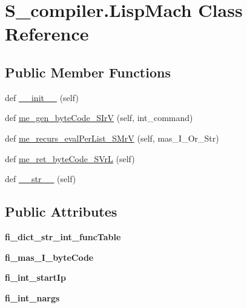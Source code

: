 \hypertarget{class_s__compiler_1_1_lisp_mach}{}\section{S\+\_\+compiler.\+Lisp\+Mach Class Reference}
\label{class_s__compiler_1_1_lisp_mach}
\subsection*{Public Member Functions}
\begin{DoxyCompactItemize}
\item 
def \hyperlink{class_s__compiler_1_1_lisp_mach_ae8fc48aace9204d62bd03ab919f28006}{\+\_\+\+\_\+init\+\_\+\+\_\+} (self)
\item 
def \hyperlink{class_s__compiler_1_1_lisp_mach_a5c4b8e5f7cfd068c6d221a83c74019bf}{me\+\_\+gen\+\_\+byte\+Code\+\_\+\+S\+IrV} (self, int\+\_\+command)
\item 
def \hyperlink{class_s__compiler_1_1_lisp_mach_aa1cda09961d2dfad40a4afe460a280fb}{me\+\_\+recurs\+\_\+eval\+Per\+List\+\_\+\+S\+MrV} (self, mas\+\_\+\+I\+\_\+\+Or\+\_\+\+Str)
\item 
def \hyperlink{class_s__compiler_1_1_lisp_mach_a97d7a7d63ea6cdaa32159a7f10947dfb}{me\+\_\+ret\+\_\+byte\+Code\+\_\+\+S\+VrL} (self)
\item 
def \hyperlink{class_s__compiler_1_1_lisp_mach_ae9e76191e088fb5607dcc5f0b30bf831}{\+\_\+\+\_\+str\+\_\+\+\_\+} (self)
\end{DoxyCompactItemize}
\subsection*{Public Attributes}
\begin{DoxyCompactItemize}
\item 
\mbox{\label{class_s__compiler_1_1_lisp_mach_a2d2b9fc9c94523397d8298626e0399c7}} 
{\bfseries fi\+\_\+dict\+\_\+str\+\_\+int\+\_\+func\+Table}
\item 
\mbox{\label{class_s__compiler_1_1_lisp_mach_ad674b58013fe0d39afdf2365b4e3bae9}} 
{\bfseries fi\+\_\+mas\+\_\+\+I\+\_\+byte\+Code}
\item 
\mbox{\label{class_s__compiler_1_1_lisp_mach_adb62f1596f1843efa8a4d04ff23322fc}} 
{\bfseries fi\+\_\+int\+\_\+start\+Ip}
\item 
\mbox{\label{class_s__compiler_1_1_lisp_mach_ad8b4a40aa190ca4c1048a0e8903dc6a4}} 
{\bfseries fi\+\_\+int\+\_\+nargs}
\end{DoxyCompactItemize}


